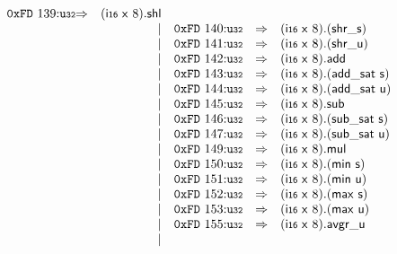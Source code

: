 $$\begin{array}{@{}l@{}rrlll@{}l@{}}
\mathtt{0xFD}~139{:}{\mathtt{u{\scriptstyle32}}} &\Rightarrow& (\mathsf{i{\scriptstyle16}}~\mathsf{x}~8) . \mathsf{shl} \\ &&|&
\mathtt{0xFD}~140{:}{\mathtt{u{\scriptstyle32}}} &\Rightarrow& (\mathsf{i{\scriptstyle16}}~\mathsf{x}~8) . ({\mathsf{shr\_}}{\mathsf{s}}) \\ &&|&
\mathtt{0xFD}~141{:}{\mathtt{u{\scriptstyle32}}} &\Rightarrow& (\mathsf{i{\scriptstyle16}}~\mathsf{x}~8) . ({\mathsf{shr\_}}{\mathsf{u}}) \\ &&|&
\mathtt{0xFD}~142{:}{\mathtt{u{\scriptstyle32}}} &\Rightarrow& (\mathsf{i{\scriptstyle16}}~\mathsf{x}~8) . \mathsf{add} \\ &&|&
\mathtt{0xFD}~143{:}{\mathtt{u{\scriptstyle32}}} &\Rightarrow& (\mathsf{i{\scriptstyle16}}~\mathsf{x}~8) . (\mathsf{add\_sat}~\mathsf{s}) \\ &&|&
\mathtt{0xFD}~144{:}{\mathtt{u{\scriptstyle32}}} &\Rightarrow& (\mathsf{i{\scriptstyle16}}~\mathsf{x}~8) . (\mathsf{add\_sat}~\mathsf{u}) \\ &&|&
\mathtt{0xFD}~145{:}{\mathtt{u{\scriptstyle32}}} &\Rightarrow& (\mathsf{i{\scriptstyle16}}~\mathsf{x}~8) . \mathsf{sub} \\ &&|&
\mathtt{0xFD}~146{:}{\mathtt{u{\scriptstyle32}}} &\Rightarrow& (\mathsf{i{\scriptstyle16}}~\mathsf{x}~8) . (\mathsf{sub\_sat}~\mathsf{s}) \\ &&|&
\mathtt{0xFD}~147{:}{\mathtt{u{\scriptstyle32}}} &\Rightarrow& (\mathsf{i{\scriptstyle16}}~\mathsf{x}~8) . (\mathsf{sub\_sat}~\mathsf{u}) \\ &&|&
\mathtt{0xFD}~149{:}{\mathtt{u{\scriptstyle32}}} &\Rightarrow& (\mathsf{i{\scriptstyle16}}~\mathsf{x}~8) . \mathsf{mul} \\ &&|&
\mathtt{0xFD}~150{:}{\mathtt{u{\scriptstyle32}}} &\Rightarrow& (\mathsf{i{\scriptstyle16}}~\mathsf{x}~8) . (\mathsf{min}~\mathsf{s}) \\ &&|&
\mathtt{0xFD}~151{:}{\mathtt{u{\scriptstyle32}}} &\Rightarrow& (\mathsf{i{\scriptstyle16}}~\mathsf{x}~8) . (\mathsf{min}~\mathsf{u}) \\ &&|&
\mathtt{0xFD}~152{:}{\mathtt{u{\scriptstyle32}}} &\Rightarrow& (\mathsf{i{\scriptstyle16}}~\mathsf{x}~8) . (\mathsf{max}~\mathsf{s}) \\ &&|&
\mathtt{0xFD}~153{:}{\mathtt{u{\scriptstyle32}}} &\Rightarrow& (\mathsf{i{\scriptstyle16}}~\mathsf{x}~8) . (\mathsf{max}~\mathsf{u}) \\ &&|&
\mathtt{0xFD}~155{:}{\mathtt{u{\scriptstyle32}}} &\Rightarrow& (\mathsf{i{\scriptstyle16}}~\mathsf{x}~8) . \mathsf{avgr\_u} \\ &&|&

\end{array}$$
